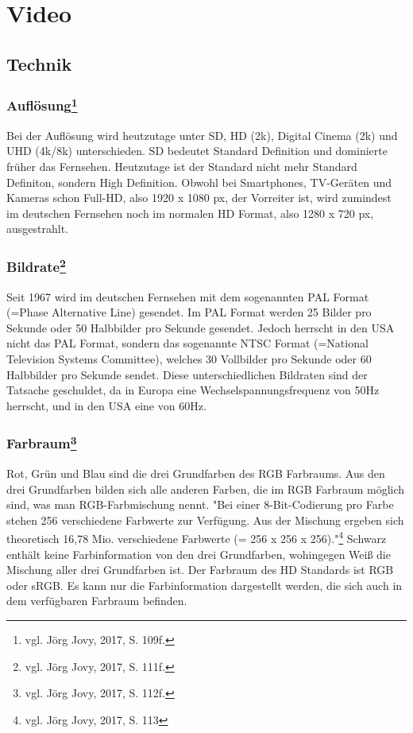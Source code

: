 \chapter{Video}
\renewcommand{\kapitelautor}{Autor: Kerstin Schön}
\section{Technik}
\subsection[Auflösung]{Auflösung\protect\footnote{\label{}vgl. Jörg Jovy, 2017, S. 109f.}}
Bei der Auflösung wird heutzutage unter SD, HD (2k), Digital Cinema (2k) und UHD (4k/8k) unterschieden. SD bedeutet Standard Definition und dominierte früher das Fernsehen. Heutzutage ist der Standard nicht mehr Standard Definiton, sondern High Definition. Obwohl bei Smartphones, TV-Geräten und Kameras schon Full-HD, also 1920 x 1080 px, der Vorreiter ist, wird zumindest im deutschen Fernsehen noch im normalen HD Format, also 1280 x 720 px, ausgestrahlt. 
\subsection[Bildrate]{Bildrate\protect\footnote{\label{}vgl. Jörg Jovy, 2017, S. 111f.}}
Seit 1967 wird im deutschen Fernsehen mit dem sogenannten PAL Format (=Phase Alternative Line) gesendet. Im PAL Format werden 25 Bilder pro Sekunde oder 50 Halbbilder pro Sekunde gesendet. Jedoch herrscht in den USA nicht das PAL Format, sondern das sogenannte NTSC Format (=National Television Systems Committee), welches 30 Vollbilder pro Sekunde oder 60 Halbbilder pro Sekunde sendet. Diese unterschiedlichen Bildraten sind der Tatsache geschuldet, da in Europa eine Wechselspannungsfrequenz von 50Hz herrscht, und in den USA eine von 60Hz.
\subsection[Farbraum]{Farbraum\protect\footnote{\label{}vgl. Jörg Jovy, 2017, S. 112f.}}
Rot, Grün und Blau sind die drei Grundfarben des RGB Farbraums. Aus den drei Grundfarben bilden sich alle anderen Farben, die im RGB Farbraum möglich sind, was man RGB-Farbmischung nennt. "Bei einer 8-Bit-Codierung pro Farbe stehen 256 verschiedene Farbwerte zur Verfügung. Aus der Mischung ergeben sich theoretisch 16,78 Mio. verschiedene Farbwerte (= 256 x 256 x 256)."\footnote{\label{}vgl. Jörg Jovy, 2017, S. 113} Schwarz enthält keine Farbinformation von den drei Grundfarben, wohingegen Weiß die Mischung aller drei Grundfarben ist. Der Farbraum des HD Standards ist RGB oder sRGB. Es kann nur die Farbinformation dargestellt werden, die sich auch in dem verfügbaren Farbraum befinden. 
